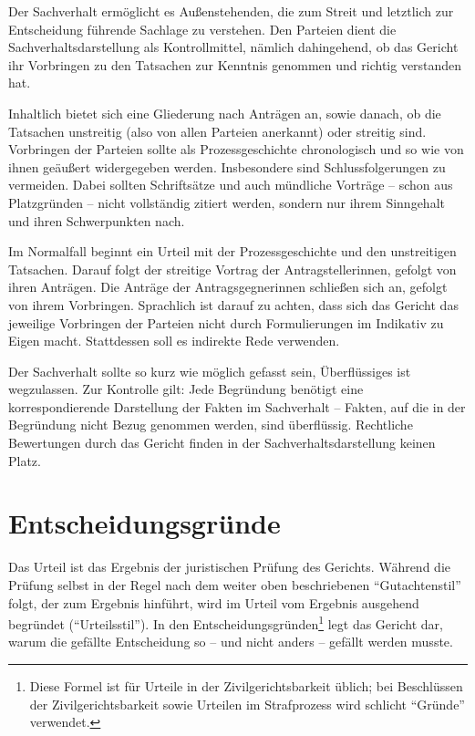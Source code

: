 Der Sachverhalt ermöglicht es Außenstehenden, die zum Streit und letztlich zur Entscheidung führende Sachlage zu verstehen.
Den Parteien dient die Sachverhaltsdarstellung als Kontrollmittel, nämlich dahingehend, ob das Gericht ihr Vorbringen zu den Tatsachen zur Kenntnis genommen und richtig verstanden hat.

Inhaltlich bietet sich eine Gliederung nach Anträgen an, sowie danach, ob die Tatsachen unstreitig (also von allen Parteien anerkannt) oder streitig sind.
Vorbringen der Parteien sollte als Prozessgeschichte chronologisch und so wie von ihnen geäußert widergegeben werden.
Insbesondere sind Schlussfolgerungen zu vermeiden.
Dabei sollten Schriftsätze und auch mündliche Vorträge – schon aus Platzgründen – nicht vollständig zitiert werden, sondern nur ihrem Sinngehalt und ihren Schwerpunkten nach.

Im Normalfall beginnt ein Urteil mit der Prozessgeschichte und den unstreitigen Tatsachen.
Darauf folgt der streitige Vortrag der Antragstellerinnen, gefolgt von ihren Anträgen.
Die Anträge der Antragsgegnerinnen schließen sich an, gefolgt von ihrem Vorbringen.
Sprachlich ist darauf zu achten, dass sich das Gericht das jeweilige Vorbringen der Parteien nicht durch Formulierungen im Indikativ zu Eigen macht.
Stattdessen soll es indirekte Rede verwenden.

Der Sachverhalt sollte so kurz wie möglich gefasst sein, Überflüssiges ist wegzulassen.
Zur Kontrolle gilt:
Jede Begründung benötigt eine korrespondierende Darstellung der Fakten im Sachverhalt – Fakten, auf die in der Begründung nicht Bezug genommen werden, sind überflüssig.
Rechtliche Bewertungen durch das Gericht finden in der Sachverhaltsdarstellung keinen Platz.

\section{Entscheidungsgründe}
\label{Urteilsaufbau:Entscheidungsgründe}
Das Urteil ist das Ergebnis der juristischen Prüfung des Gerichts.
Während die Prüfung selbst in der Regel nach dem weiter oben beschriebenen \enquote{Gutachtenstil} folgt, der zum Ergebnis hinführt, wird im Urteil vom Ergebnis ausgehend begründet (\enquote{Urteilsstil}).
In den Entscheidungsgründen\footnote{Diese Formel ist für Urteile in der Zivilgerichtsbarkeit üblich; bei Beschlüssen der Zivilgerichtsbarkeit sowie Urteilen im Strafprozess wird schlicht \enquote{Gründe} verwendet.} legt das Gericht dar, warum die gefällte Entscheidung so – und nicht anders – gefällt werden musste.


